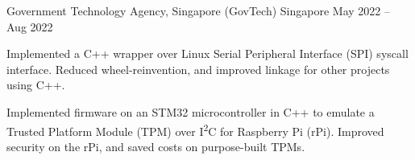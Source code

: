 \begin{cventries}
	{Government Technology Agency, Singapore (GovTech)} %
	{Singapore} %
	{May 2022 -- Aug 2022} %
	{
		\begin{cvitems} %
			\item Implemented a C++ wrapper over Linux Serial Peripheral Interface (SPI) syscall interface. Reduced wheel-reinvention, and improved linkage for other projects using C++.
			\item Implemented firmware on an STM32 microcontroller in C++ to emulate a Trusted Platform Module (TPM) over I\textsuperscript{2}C for Raspberry Pi (rPi). Improved security on the rPi, and saved costs on purpose-built TPMs.
		\end{cvitems}
	}


\end{cventries}
